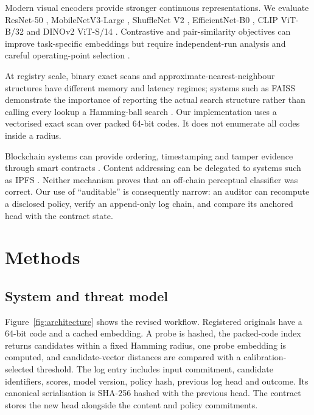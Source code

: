 \documentclass[12pt]{article}
\begin{document}
Modern visual encoders provide stronger continuous representations. We evaluate ResNet-50 \cite{he2016resnet}, MobileNetV3-Large \cite{howard2019mobilenetv3}, ShuffleNet V2 \cite{ma2018shufflenet}, EfficientNet-B0 \cite{tan2019efficientnet}, CLIP ViT-B/32 \cite{radford2021clip} and DINOv2 ViT-S/14 \cite{oquab2024dinov2}. Contrastive and pair-similarity objectives can improve task-specific embeddings but require independent-run analysis and careful operating-point selection \cite{khosla2020supcon,sun2020circle}.

At registry scale, binary exact scans and approximate-nearest-neighbour structures have different memory and latency regimes; systems such as FAISS demonstrate the importance of reporting the actual search structure rather than calling every lookup a Hamming-ball search \cite{johnson2021faiss}. Our implementation uses a vectorised exact scan over packed 64-bit codes. It does not enumerate all codes inside a radius.

Blockchain systems can provide ordering, timestamping and tamper evidence through smart contracts \cite{christidis2016smartcontracts,liang2017provenance}. Content addressing can be delegated to systems such as IPFS \cite{benet2014ipfs}. Neither mechanism proves that an off-chain perceptual classifier was correct. Our use of ``auditable'' is consequently narrow: an auditor can recompute a disclosed policy, verify an append-only log chain, and compare its anchored head with the contract state.

\color{black}
\section{Methods}
\color{revisionred}

\subsection{System and threat model}

Figure~\ref{fig:architecture} shows the revised workflow. Registered originals have a 64-bit code and a cached embedding. A probe is hashed, the packed-code index returns candidates within a fixed Hamming radius, one probe embedding is computed, and candidate-vector distances are compared with a calibration-selected threshold. The log entry includes input commitment, candidate identifiers, scores, model version, policy hash, previous log head and outcome. Its canonical serialisation is SHA-256 hashed with the previous head. The contract stores the new head alongside the content and policy commitments.
\end{document}
